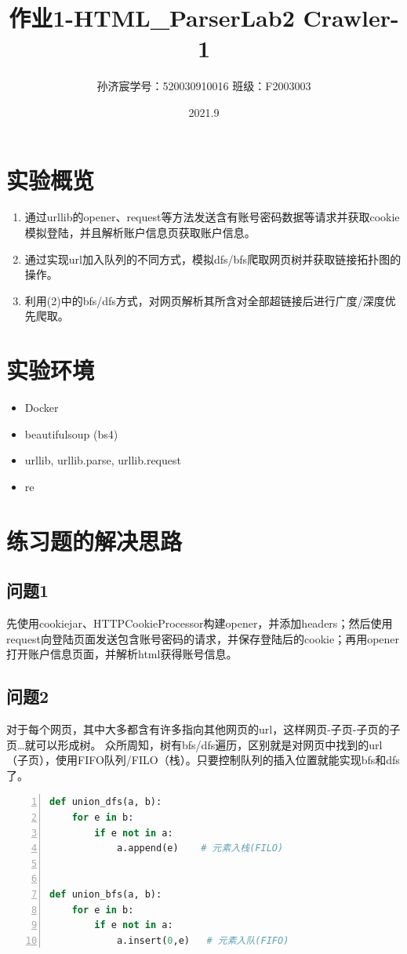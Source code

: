\documentclass[12pt,a4paper,oneside]{article}
\title{作业1-HTML_Parser}
\title{Lab2 \quad Crawler-1}
\date{2021.9}
\author{孙济宸\quad \quad 学号：520030910016 \quad  \quad 班级：F2003003}
\begin{document}
\maketitle
\section{实验概览}
\begin{enumerate}
	\item 通过urllib的opener、request等方法发送含有账号密码数据等请求并获取cookie模拟登陆，并且解析账户信息页获取账户信息。
	\item 通过实现url加入队列的不同方式，模拟dfs/bfs爬取网页树并获取链接拓扑图的操作。
	\item 利用(2)中的bfs/dfs方式，对网页解析其所含对全部超链接后进行广度/深度优先爬取。
\end{enumerate}
\section{实验环境}
\begin{itemize}
	\item Docker
	\item beautifulsoup (bs4)
	\item urllib, urllib.parse, urllib.request
	\item re
\end{itemize}
\section{练习题的解决思路}
\subsection{问题1}
先使用cookiejar、HTTPCookieProcessor构建opener，并添加headers；然后使用request向登陆页面发送包含账号密码的请求，并保存登陆后的cookie；再用opener打开账户信息页面，并解析html获得账号信息。
\subsection{问题2}
对于每个网页，其中大多都含有许多指向其他网页的url，这样网页-子页-子页的子页\dots 就可以形成树。
众所周知，树有bfs/dfs遍历，区别就是对网页中找到的url（子页），使用FIFO队列/FILO（栈）。只要控制队列的插入位置就能实现bfs和dfs了。


\begin{lstlisting}[language={Python},numbers=left,numberstyle=\tiny,%frame=shadowbox, rulesepcolor=\color{red!20!green!20!blue!20},  
   keywordstyle=\color{blue!70!black},  
   commentstyle=\color{blue!90!},  
   basicstyle=\ttfamily]  
def union_dfs(a, b):
    for e in b:
        if e not in a:
            a.append(e)    # 元素入栈(FILO)


def union_bfs(a, b):
    for e in b:
        if e not in a:
            a.insert(0,e)   # 元素入队(FIFO)
\end{lstlisting}  
\end{document}
